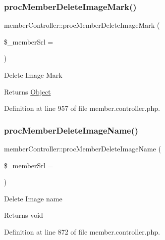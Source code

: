 \subsubsection{\texorpdfstring{proc\+Member\+Delete\+Image\+Mark()}{procMemberDeleteImageMark()}}
{\footnotesize\ttfamily member\+Controller\+::proc\+Member\+Delete\+Image\+Mark (\begin{DoxyParamCaption}\item[{}]{\$\+\_\+member\+Srl = {} }\end{DoxyParamCaption})}

Delete Image Mark

\begin{DoxyReturn}{Returns}
\hyperlink{classObject}{Object} 
\end{DoxyReturn}


Definition at line 957 of file member.\+controller.\+php.

\mbox{\label{classmemberController_a5b2d6f21719829dcf1b422e9958bcf48}} 
\subsubsection{\texorpdfstring{proc\+Member\+Delete\+Image\+Name()}{procMemberDeleteImageName()}}
{\footnotesize\ttfamily member\+Controller\+::proc\+Member\+Delete\+Image\+Name (\begin{DoxyParamCaption}\item[{}]{\$\+\_\+member\+Srl = {} }\end{DoxyParamCaption})}

Delete Image name

\begin{DoxyReturn}{Returns}
void 
\end{DoxyReturn}


Definition at line 872 of file member.\+controller.\+php.

\mbox{\label{classmemberController_a469c2f84ff27c0fb9fc9ae7f3b921548}} 
